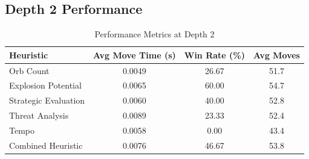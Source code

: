 \documentclass[12pt]{article}
\begin{document}
\subsection{Depth 2 Performance}
\begin{table}[ht]
  \centering
  \caption{Performance Metrics at Depth 2}
  \label{tab:metrics_depth2}
  \begin{tabular}{lccc}
    \toprule
    Heuristic                & Avg Move Time (s) & Win Rate (\%) & Avg Moves \\
    \midrule
    Orb Count                & 0.0049            & 26.67         & 51.7      \\
    Explosion Potential      & 0.0065            & 60.00         & 54.7      \\
    Strategic Evaluation     & 0.0060            & 40.00         & 52.8      \\
    Threat Analysis          & 0.0089            & 23.33         & 52.4      \\
    Tempo                    & 0.0058            &  0.00         & 43.4      \\
    Combined Heuristic       & 0.0076            & 46.67         & 53.8      \\
    \bottomrule
  \end{tabular}
\end{table}


\end{document}
